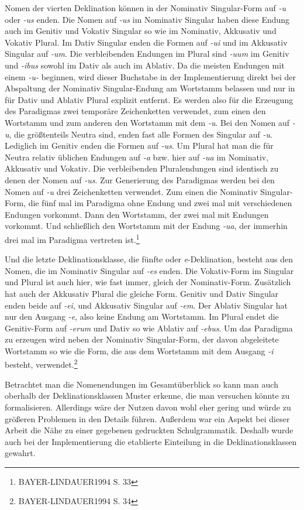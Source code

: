 \documentclass[12pt,abstract=on]{scrreprt}
\begin{document}
Nomen der vierten Deklination können in der Nominativ Singular-Form auf \textit{-u} oder \textit{-us} enden. Die Nomen auf \textit{-us} im Nominativ Singular haben diese Endung auch im Genitiv und Vokativ Singular so wie im Nominativ, Akkusativ und Vokativ Plural. Im Dativ Singular enden die Formen auf \textit{-ui} und im Akkusativ Singular auf \textit{-um}. Die verbleibenden Endungen im Plural sind \textit{-uum} im Genitiv und \textit{-ibus} sowohl im Dativ als auch im Ablativ. Da die meisten Endungen mit einem \textit{-u-} beginnen, wird dieser Buchstabe in der Implementierung direkt bei der Abspaltung der Nominativ Singular-Endung am Wortstamm belassen und nur in für Dativ und Ablativ Plural explizit entfernt. Es werden also für die Erzeugung des Paradigmas zwei temporäre Zeichenketten verwendet, zum einen den Wortstamm und zum anderen den Wortstamm mit dem \textit{-u}. Bei den Nomen auf \textit{-u}, die größtenteils Neutra sind, enden fast alle Formen des Singular auf \textit{-u}. Lediglich im Genitiv enden die Formen auf \textit{-us}. Um Plural hat man die für Neutra relativ üblichen Endungen auf \textit{-a} bzw. hier auf \textit{-ua} im Nominativ, Akkusativ und Vokativ. Die verbleibenden Pluralendungen sind identisch zu denen der Nomen auf \textit{-us}. Zur Generierung des Paradigmas werden bei den Nomen auf \textit{-u} drei Zeichenketten verwendet. Zum einen die Nominativ Singular-Form, die fünf mal im Paradigma ohne Endung und zwei mal mit verschiedenen Endungen vorkommt. Dann den Wortstamm, der zwei mal mit Endungen vorkommt. Und schließlich den Wortstamm mit der Endung \textit{-ua}, der immerhin drei mal im Paradigma vertreten ist.\footnote{BAYER-LINDAUER1994 S. 33} \par
Und die letzte Deklinationsklasse, die fünfte oder \textit{e}-Deklination, besteht aus den Nomen, die im Nominativ Singular auf \textit{-es} enden. Die Vokativ-Form im Singular und Plural ist auch hier, wie fast immer, gleich der Nominativ-Form. Zusätzlich hat auch der Akkusativ Plural die gleiche Form. Genitiv und Dativ Singular enden beide auf \textit{-ei}, und Akkusativ Singular auf \textit{-em}. Der Ablativ Singular hat nur den Ausgang \textit{-e}, also keine Endung am Wortstamm. Im Plural endet die Genitiv-Form auf \textit{-erum} und Dativ so wie Ablativ auf \textit{-ebus}. Um das Paradigma zu erzeugen wird neben der Nominativ Singular-Form, der davon abgeleitete Wortstamm so wie die Form, die aus dem Wortstamm mit dem Ausgang \textit{-i} besteht, verwendet.\footnote{BAYER-LINDAUER1994 S. 34} \par
Betrachtet man die Nomenendungen im Gesamtüberblick so kann man auch oberhalb der Deklinationsklassen Muster erkenne, die man versuchen könnte zu formalisieren. Allerdings wäre der Nutzen davon wohl eher gering und würde zu größeren Problemen in den Details führen. Außerdem war ein Aspekt bei dieser Arbeit die Nähe zu einer gegebenen gedruckten Schulgrammatik. Deshalb wurde auch bei der Implementierung die etablierte Einteilung in die Deklinationsklassen gewahrt.
\end{document}
